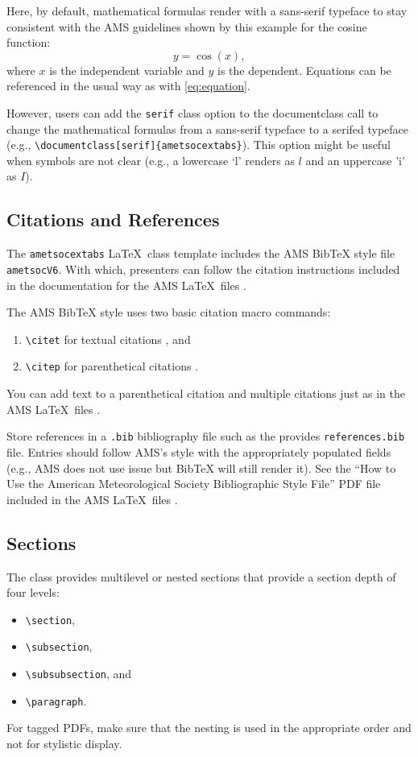 \documentclass[9pt]{ametsocextabs}
\begin{document}
Here, by default, mathematical formulas render with a sans-serif
typeface to stay consistent with the AMS guidelines shown by this
example for the cosine function:
\begin{equation}
    y = \cos (x),
    \label{eq:equation}
\end{equation}
where $x$ is the independent variable and $y$ is the dependent.
Equations can be referenced in the usual way as with \eqref{eq:equation}.

However, users can add the \texttt{serif} class option to the
documentclass call to change the mathematical formulas from a
sans-serif typeface to a serifed typeface (e.g.,
\texttt{\textbackslash documentclass[serif]\{ametsocextabs\}}). This
option might be useful when symbols are not clear (e.g., a lowercase
`l' renders as $l$ and an uppercase 'i' as $I$).

\subsection{Citations and References}
The \lowercase{\texttt{ametsocextabs}} \LaTeX\ class template
includes the AMS BibTeX style file \texttt{ametsocV6}. With which,
presenters can follow the citation instructions included in the
documentation for the AMS \LaTeX\ files \cite{AMS2025latex, AMS2025doc}.

The AMS BibTeX style uses two basic citation macro commands:
\begin{enumerate}
    \item \texttt{\textbackslash citet} for textual citations \rightarrow \citet{Eliassen1951}, and
    \item \texttt{\textbackslash citep} for parenthetical citations  \rightarrow \citep{Eliassen1951}.
\end{enumerate}
You can add text to a parenthetical citation and multiple
citations just as in the AMS \LaTeX\ files
\citep[e.g.,][]{Eliassen1951,AMS2025latex, AMS2025doc}.

Store references in a \texttt{.bib} bibliography file such as the
provides \texttt{references.bib} file. Entries should follow AMS's
style with the appropriately populated fields (e.g., AMS does not
use issue but BibTeX will still render it). See the ``How to Use the
American Meteorological Society Bibliographic Style File'' PDF file
included in the AMS \LaTeX\ files \cite{AMS2025latex, AMS2025doc}.

\subsection{Sections}
The class provides multilevel or nested sections that provide
a section depth of four levels:
\begin{itemize}
    \item \texttt{\textbackslash section},
    \item \texttt{\textbackslash subsection},
    \item \texttt{\textbackslash subsubsection}, and
    \item \texttt{\textbackslash paragraph}.
\end{itemize}
For tagged PDFs, make sure that the nesting is used in the
appropriate order and not for stylistic display.
\end{document}
